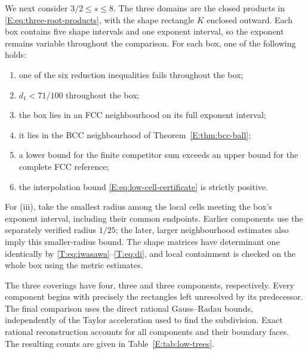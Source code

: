 \documentclass[reqno,english]{amsart}
\theoremstyle{definition}
\newtheorem{open problem}[theorem]{Open Problem}
\theoremstyle{remark}
\theoremstyle{plain}
\numberwithin{equation}{section}
\begin{document}
We next consider $3/2\le s\le8$. The three domains are the closed
products in \eqref{E:eq:three-root-products}, with the shape rectangle
$K$ enclosed outward. Each box contains five shape intervals and one
exponent interval, so the exponent remains variable throughout the
comparison. For each box, one of the following holds:
\begin{enumerate}\renewcommand{\labelenumi}{(\roman{enumi})}
\item one of the six reduction inequalities fails throughout the box;
\item $d_1<71/100$ throughout the box;
\item the box lies in an FCC neighbourhood on its full exponent interval;
\item it lies in the BCC neighbourhood of Theorem~\ref{E:thm:bcc-ball};
\item a lower bound for the finite competitor sum exceeds an upper
bound for the complete FCC reference;
\item the interpolation bound \eqref{E:eq:low-cell-certificate}
is strictly positive.
\end{enumerate}
For (iii), take the smallest radius among the local cells meeting the
box's exponent interval, including their common endpoints. Earlier
components use the separately verified radius $1/25$; the later,
larger neighbourhood estimates also imply this smaller-radius bound.
The shape matrices have determinant one identically by
\eqref{T:eq:iwasawa}--\eqref{T:eq:di}, and local containment is checked
on the whole box using the metric estimates.

The three coverings have four, three and three components, respectively.
Every component begins with precisely the rectangles left unresolved
by its predecessor. The final comparison uses the direct rational
Gauss--Radau bounds, independently of the Taylor acceleration used to
find the subdivision. Exact rational reconstruction accounts for all
components and their boundary faces. The resulting counts are given
in Table~\ref{E:tab:low-trees}.
\end{document}

